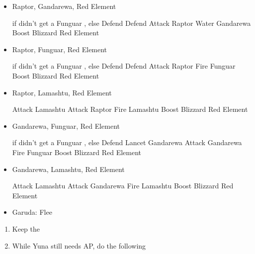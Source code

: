 \begin{encounters}
  \begin{itemize} 
    \item Raptor, Gandarewa, Red Element
    \begin{itemize}
    	\switch{\tidus}{\kimahri} if didn't get a Funguar \od, else Defend
    	\kimahrif Defend
    	\wakkaf Attack Raptor
    	\summon{\valefor}
    	\valeforf  Water Gandarewa
	\valeforf Boost
	\valeforf Blizzard Red Element
	\end{itemize}
	\item Raptor, Funguar, Red Element
    \begin{itemize}
    	\switch{\tidus}{\kimahri} if didn't get a Funguar \od, else Defend
    	\kimahrif Defend
    	\wakkaf Attack Raptor
    	\summon{\valefor}
    	\valeforf  Fire Funguar
	\valeforf Boost
	\valeforf Blizzard Red Element
	\end{itemize}
	\item Raptor, Lamashtu, Red Element
	\begin{itemize}
	\switch{\tidus}{\kimahri}
	\kimahrif  Attack Lamashtu
	\wakkaf Attack Raptor
	\switch{\auron}{\yuna}
	\summon{\valefor}
	\valeforf Fire Lamashtu
	\valeforf Boost
	\valeforf Blizzard Red Element
	\end{itemize}
	\item Gandarewa, Funguar, Red Element
    \begin{itemize}
    	\switch{\tidus}{\kimahri} if didn't get a Funguar \od, else Defend
    	\kimahrif Lancet Gandarewa
    	\wakkaf  Attack Gandarewa
	\switch{\auron}{\yuna}
	\summon{\valefor}
	\valeforf Fire Funguar
	\valeforf Boost
	\valeforf Blizzard Red Element
	\end{itemize}
	\item Gandarewa, Lamashtu, Red Element
	\begin{itemize}
	\switch{\tidus}{\kimahri}
	\kimahrif  Attack Lamashtu
    	\wakkaf  Attack Gandarewa
	\switch{\auron}{\yuna}
	\summon{\valefor}
	\valeforf Fire Lamashtu
	\valeforf Boost
	\valeforf Blizzard Red Element
	\end{itemize}	
    \item Garuda: Flee
  \end{itemize}
\end{encounters}
\begin{enumerate}[resume]
  \item Keep the \formation{\kimahri}{\wakka}{\yuna}
  \item While Yuna still needs AP, do the following
\end{enumerate}
